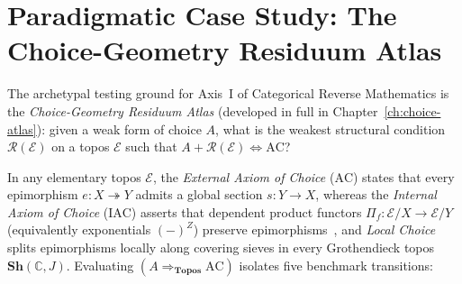 \section{Paradigmatic Case Study: The Choice-Geometry Residuum Atlas}

The archetypal testing ground for Axis~I of Categorical Reverse Mathematics is the \emph{Choice-Geometry Residuum Atlas} (developed in full in Chapter~\ref{ch:choice-atlas}): given a weak form of choice $A$, what is the weakest structural condition $\mathcal{R}(\mathcal{E})$ on a topos $\mathcal{E}$ such that $A + \mathcal{R}(\mathcal{E}) \iff \mathrm{AC}$?

In any elementary topos $\mathcal{E}$, the \emph{External Axiom of Choice} ($\mathrm{AC}$) states that every epimorphism $e: X \twoheadrightarrow Y$ admits a global section $s: Y \to X$, whereas the \emph{Internal Axiom of Choice} ($\mathrm{IAC}$) asserts that dependent product functors $\Pi_f : \mathcal{E}/X \to \mathcal{E}/Y$ (equivalently exponentials $(-)^Z$) preserve epimorphisms~\cite{Johnstone02}, and \emph{Local Choice} splits epimorphisms locally along covering sieves in every Grothendieck topos $\mathbf{Sh}(\mathbb{C}, J)$. Evaluating $(A \Rightarrow_{\mathbf{Topos}} \mathrm{AC})$ isolates five benchmark transitions:

